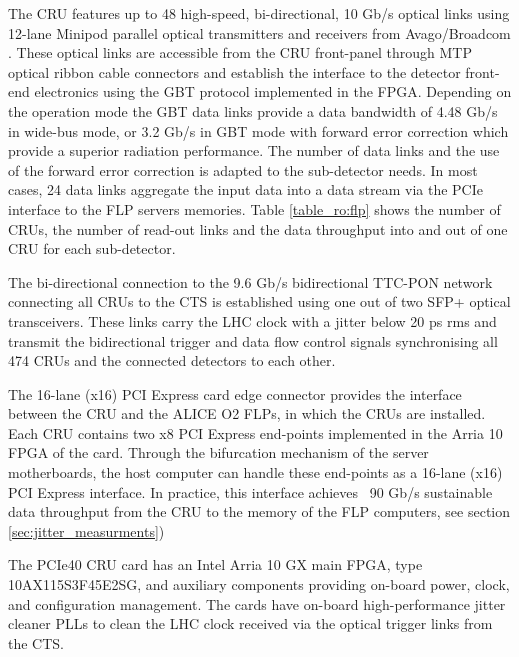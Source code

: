 The CRU features up to 48 high-speed, bi-directional, 10 Gb/s optical links using 12-lane Minipod parallel optical transmitters and receivers from Avago/Broadcom \cite{ro:minipods}. These optical links are accessible from the CRU front-panel through MTP optical ribbon cable connectors and establish the interface to the detector front-end electronics using the GBT protocol implemented in the FPGA.
Depending on the operation mode the GBT data links provide a data bandwidth of 4.48 Gb/s in wide-bus mode, or 3.2 Gb/s in GBT mode with forward error correction which provide a superior radiation performance. The number of data links and the use of the forward error correction is adapted to the sub-detector needs. In most cases, 24 data links aggregate the input data into a data stream via the PCIe interface to the FLP servers memories. Table \ref{table_ro:flp} shows the number of CRUs, the number of read-out links and the data throughput into and out of one CRU for each sub-detector.

The bi-directional connection to the 9.6 Gb/s bidirectional TTC-PON network connecting all CRUs to the CTS is established using one out of two SFP+ optical transceivers. These links carry the LHC clock with a jitter below 20 ps rms and transmit the bidirectional trigger and data flow control signals synchronising all 474 CRUs and the connected detectors to each other. 

The 16-lane (x16) PCI Express card edge connector provides the interface between the CRU and the ALICE O2 FLPs, in which the CRUs are installed. Each CRU contains two x8 PCI Express end-points implemented in the Arria 10 FPGA of the card. Through the bifurcation mechanism of the server motherboards, the host computer can handle these end-points as a 16-lane (x16) PCI Express interface. In practice, this interface achieves ~90 Gb/s sustainable data throughput from the CRU to the memory of the FLP computers, see section \ref{sec:jitter_measurments})

The PCIe40 CRU card has an Intel Arria 10 GX main FPGA, type 10AX115S3F45E2SG, and auxiliary components providing on-board power, clock, and configuration management. The cards have on-board high-performance jitter cleaner PLLs to clean the LHC clock received via the optical trigger links from the CTS. 

